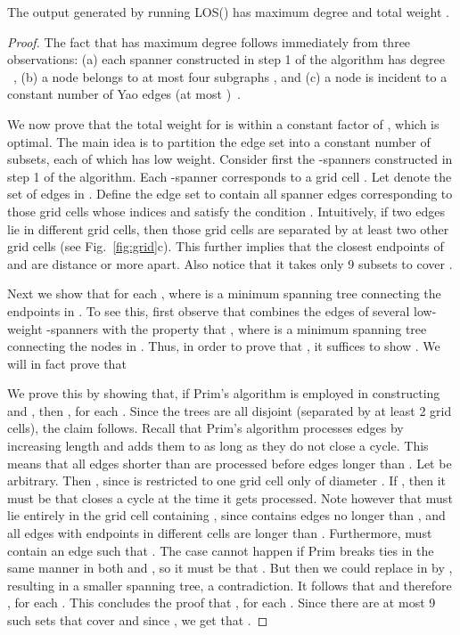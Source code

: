 \documentclass{llncs}
\newcommand{\alg}{{\sc LOS}}
\begin{document}
\begin{theorem}
The output  generated by running \alg() has maximum degree  and total weight .
\label{thm:degreeweight}
\end{theorem}
\begin{proof}
The fact that  has maximum degree  follows immediately from three observations:
(a) each spanner  constructed in step 1 of the algorithm has degree ~\cite{DN97},
(b) a node  belongs to at most four subgraphs , and
(c) a node  is incident to a constant number of Yao edges (at most )~\cite{li02sparse}.

We now prove that the total weight for  is within a constant factor of ,
which is optimal. The main idea is to partition the edge set  into a constant
number of subsets, each of which has low weight.
Consider first the -spanners constructed in step 1 of the algorithm.
Each -spanner  corresponds to a grid cell . Let  denote
the set of edges in . Define the edge
set  to contain all spanner edges corresponding to those grid cells 
whose indices  and  satisfy the condition .
Intuitively, if two edges  lie in different grid cells, then
those grid cells are separated by at least two other grid cells (see Fig.~\ref{fig:grid}c).
This further implies that the closest endpoints of  and  are distance 
or more apart. Also notice that it takes only 9 subsets  to cover
.

Next we show that  for each , where
 is a minimum spanning tree connecting the endpoints in .
To see this, first observe that  combines the edges of several low-weight -spanners
 with the property that ,
where  is a minimum spanning tree connecting the nodes in . Thus, in order
to prove that , it suffices to show
. We will in fact prove that

We prove this by showing that, if Prim's algorithm is employed in constructing  and , then
, for each . Since the trees  are all disjoint (separated by at
least 2 grid cells), the claim follows.
Recall that Prim's algorithm processes edges by increasing length and adds them to
 as long as they do not close a cycle. This means that all edges shorter than
 are processed before edges longer than . Let  be
arbitrary. Then , since  is restricted to one grid cell only of diameter .
If , then it must be that  closes a cycle  at the time it gets
processed. Note however that  must lie entirely in the grid cell containing
, since  contains edges no longer than , and all edges with endpoints
in different cells are longer than .
Furthermore,  must contain an edge  such that . The
case  cannot happen if Prim breaks ties in the same manner in both
 and , so it must be that .
But then we could replace  in  by , resulting in a smaller
spanning tree, a contradiction. It follows that  and therefore
, for each . This concludes the proof that
, for each . Since there are at most 9 such sets
 that cover  and since , we get that .


\end{proof}
\end{document}

